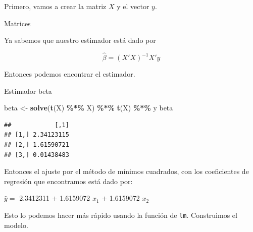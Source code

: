 \documentclass[
]{book}
\newenvironment{Shaded}{\begin{snugshade}}{\end{snugshade}}
\newcommand{\AttributeTok}[1]{\textcolor[rgb]{0.13,0.29,0.53}{#1}}
\newcommand{\CommentTok}[1]{\textcolor[rgb]{0.56,0.35,0.01}{\textit{#1}}}
\newcommand{\DecValTok}[1]{\textcolor[rgb]{0.00,0.00,0.81}{#1}}
\newcommand{\FunctionTok}[1]{\textcolor[rgb]{0.13,0.29,0.53}{\textbf{#1}}}
\newcommand{\NormalTok}[1]{#1}
\newcommand{\OtherTok}[1]{\textcolor[rgb]{0.56,0.35,0.01}{#1}}
\newcommand{\SpecialCharTok}[1]{\textcolor[rgb]{0.81,0.36,0.00}{\textbf{#1}}}
\begin{document}
Primero, vamos a crear la matriz \(X\) y el vector \(y\).

Matrices

\begin{Shaded}
\end{Shaded}

Ya sabemos que nuestro estimador está dado por

\[
\hat{\beta} = (X'X)^{-1}X'y
\]

Entonces podemos encontrar el estimador.

Estimador beta

\begin{Shaded}
\begin{Highlighting}[]
\NormalTok{beta }\OtherTok{\textless{}{-}} \FunctionTok{solve}\NormalTok{(}\FunctionTok{t}\NormalTok{(X) }\SpecialCharTok{\%*\%}\NormalTok{ X) }\SpecialCharTok{\%*\%} \FunctionTok{t}\NormalTok{(X) }\SpecialCharTok{\%*\%}\NormalTok{ y}
\NormalTok{beta}
\end{Highlighting}
\end{Shaded}

\begin{verbatim}
##            [,1]
## [1,] 2.34123115
## [2,] 1.61590721
## [3,] 0.01438483
\end{verbatim}

Entonces el ajuste por el método de mínimos cuadrados, con los coeficientes de regresión que encontramos está dado por:

\(\hat{y} =\) 2.3412311 \(+\) 1.6159072 \(x_1\) \(+\) 1.6159072 \(x_2\)

Esto lo podemos hacer más rápido usando la función de \texttt{lm}. Construimos el modelo.
\end{document}
